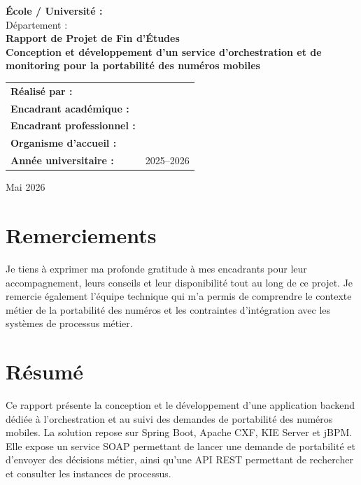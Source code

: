 \documentclass[12pt,a4paper]{report}
\begin{document}
\begin{titlepage}
    \centering
    \vspace*{1cm}
    {\Large \textbf{École / Université : \underline{\hspace{7cm}}}}\\[0.4cm]
    {\Large Département : \underline{\hspace{7cm}}}\\[2cm]

    {\Huge \textbf{Rapport de Projet de Fin d'Études}}\\[0.8cm]
    {\LARGE \textbf{Conception et développement d'un service d'orchestration et de monitoring pour la portabilité des numéros mobiles}}\\[2cm]

    \begin{tabular}{>{\bfseries}p{5cm}p{8cm}}
        Réalisé par : & \underline{\hspace{7cm}}\\[0.4cm]
        Encadrant académique : & \underline{\hspace{7cm}}\\[0.4cm]
        Encadrant professionnel : & \underline{\hspace{7cm}}\\[0.4cm]
        Organisme d'accueil : & \underline{\hspace{7cm}}\\[0.4cm]
        Année universitaire : & 2025--2026
    \end{tabular}

    \vfill
    {\large Mai 2026}
\end{titlepage}


\chapter*{Remerciements}
Je tiens à exprimer ma profonde gratitude à mes encadrants pour leur accompagnement, leurs conseils et leur disponibilité tout au long de ce projet. Je remercie également l'équipe technique qui m'a permis de comprendre le contexte métier de la portabilité des numéros et les contraintes d'intégration avec les systèmes de processus métier.

\chapter*{Résumé}
Ce rapport présente la conception et le développement d'une application backend dédiée à l'orchestration et au suivi des demandes de portabilité des numéros mobiles. La solution repose sur Spring Boot, Apache CXF, KIE Server et jBPM. Elle expose un service SOAP permettant de lancer une demande de portabilité et d'envoyer des décisions métier, ainsi qu'une API REST permettant de rechercher et consulter les instances de processus.
\end{document}
